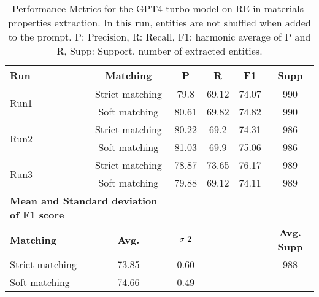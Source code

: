 \begin{table}[htbp]
    \small
    \centering
    \caption{Performance Metrics for the GPT4-turbo model on RE in materials-properties extraction. In this run, entities are not shuffled when added to the prompt. P: Precision, R: Recall, F1: harmonic average of P and R, Supp: Support, number of extracted entities.}
    \begin{tabular}{lccccc}
        \toprule
        \textbf{Run} & \textbf{Matching} & \textbf{P} & \textbf{R} & \textbf{F1} & \textbf{Supp} \\
        \midrule
        \multirow{2}{*}{Run1} & Strict matching & 79.8 & 69.12 & 74.07 & 990 \\
        & Soft matching & 80.61 & 69.82 & 74.82 & 990 \\
        \midrule
        \multirow{2}{*}{Run2} & Strict matching & 80.22 & 69.2 & 74.31 & 986 \\
        & Soft matching & 81.03 & 69.9 & 75.06 & 986 \\
        \midrule
        \multirow{2}{*}{Run3} & Strict matching & 78.87 & 73.65 & 76.17 & 989 \\
        & Soft matching & 79.88 & 69.12 & 74.11 & 989 \\
        \midrule
        \multicolumn{2}{l}{\textbf{Mean and Standard deviation of F1 score}} & & & & \\
        \midrule
        \textbf{Matching} & \textbf{Avg.} & $\sigma\textsuperscript{2}$ & & & \textbf{Avg. Supp}\\
        Strict matching & 73.85	& 0.60 & & & 988 \\
        Soft matching & 74.66 & 0.49 & & \\
        \bottomrule
    \end{tabular}
\end{table}

